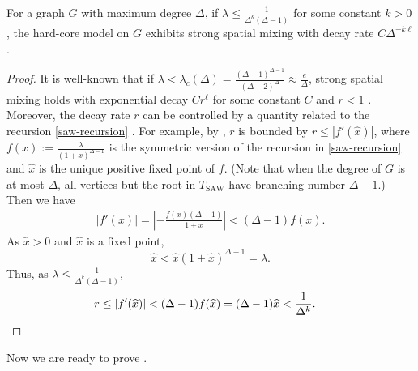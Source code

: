 \documentclass{theoretics}
\newcommand{\abs}[1]{\ensuremath{\left\vert#1\right\vert}}
\newcommand{\eps}{\varepsilon}
\newcommand{\defeq}{:=}
\newcommand{\TSAW}{T_{\mathrm{SAW}}}
\begin{document}
\begin{lemma}
\label{lem:contraction}
  For a graph $G$ with maximum degree $\Delta$, if $\lambda\leq\frac{1}{\Delta^k(\Delta-1)}$ for some constant $k>0$, the hard-core model on $G$ exhibits strong spatial mixing with decay rate $C\Delta^{-k\ell}$. 
\end{lemma}

\begin{proof}
  It is well-known that if $\lambda<\lambda_c(\Delta) = \frac{(\Delta-1)^{\Delta-1}}{(\Delta-2)^{\Delta}}\approx\frac{e}{\Delta}$,
  strong spatial mixing holds with exponential decay $Cr^{\ell}$ for some constant $C$ and $r<1$ \cite{Wei06}.
  Moreover, the decay rate $r$ can be controlled by a quantity related to the recursion \eqref{saw-recursion} \cite{SST14}.
  For example, by \cite[Lemma 7.20]{Guo15}, $r$ is bounded by $r\le|f'(\widehat{x})|$,
  where $f(x)\defeq\frac{\lambda}{(1+x)^{\Delta-1}}$ is the symmetric version of the recursion in \eqref{saw-recursion} and $\widehat{x}$ is the unique positive fixed point of $f$.
  (Note that when the degree of $G$ is at most $\Delta$, all vertices but the root in $\TSAW$ have branching number $\Delta-1$.)
  Then we have
  \begin{align*}
    \abs{f'(x)} = \abs{-\frac{f(x)(\Delta-1)}{1+x}} < (\Delta-1) f(x).
  \end{align*}
  As $\widehat{x}>0$ and $\widehat{x}$ is a fixed point,
  \[\widehat{x}<\widehat{x}(1+\widehat{x})^{\Delta-1}=\lambda.\]
  Thus, as $\lambda\leq\frac{1}{\Delta^k(\Delta-1)}$,
  \begin{align*}
    r&\le|f'(\widehat{x})|< (\Delta-1) f(\widehat{x})=(\Delta-1)\widehat{x}<\frac{1}{\Delta^k}. \qedhere
  \end{align*}
\end{proof}

Now we are ready to prove .

\def\epsnot{\eps_0}
\end{document}
